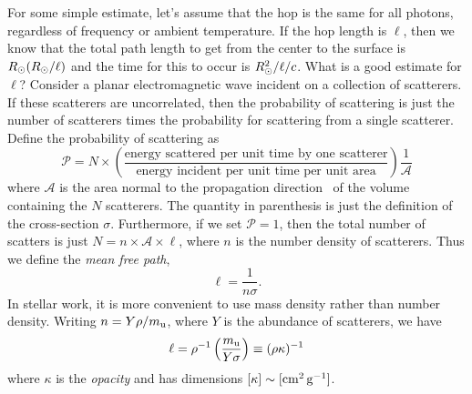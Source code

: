 For some simple estimate, let's assume that the hop is the same for all photons, regardless of frequency or ambient temperature. If the hop length is $\ell$, then we know that the total path length to get from the center to the surface is $R_{\odot}(R_{\odot}/\ell)$ and the time for this to occur is $R_{\odot}^{2}/\ell/c$. What is a good estimate for $\ell$?  Consider a planar electromagnetic wave incident on a collection of scatterers. If these scatterers are uncorrelated, then the probability of scattering is just the number of scatterers times the probability for scattering from a single scatterer.  Define the probability of scattering as
\begin{equation}\label{e.scattering-probability}
\mathcal{P} = N\times\left(\frac{\textrm{energy scattered per unit time by one scatterer}}{\textrm{energy incident per unit time per unit area}}\right)\frac{1}{ \mathcal{A}}
\end{equation}
where $\mathcal{A}$ is the area normal to the propagation direction \unitk\ of the volume containing the $N$ scatterers.  The quantity in parenthesis is just the definition of the cross-section $\sigma$. Furthermore, if we set $\mathcal{P} = 1$, then the total number of scatters is just $N = n\times \mathcal{A}\times \ell$, where $n$ is the number density of scatterers. Thus we define the \emph{mean free path},
\begin{equation}\label{e.mean-free-path}
\ell = \frac{1}{n\sigma}.
\end{equation}
In stellar work, it is more convenient to use mass density rather than number density.  Writing $n = Y\rho/m_\mathrm{u}$, where $Y$ is the abundance of scatterers, we have
\[ \ell = \rho^{-1} \left(\frac{m_\mathrm{u}}{Y\sigma}\right) \equiv (\rho\kappa)^{-1} \]
where $\kappa$ is the \emph{opacity} and has dimensions $[\kappa]\sim[\mathrm{c}\mathrm{m}^{2}\,\mathrm{g}^{-1}]$.

